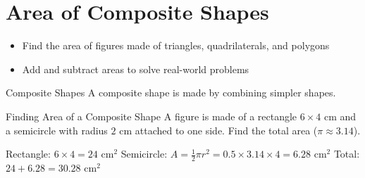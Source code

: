 \section{Area of Composite Shapes}

\begin{learningGoals}
\begin{itemize}
    \item Find the area of figures made of triangles, quadrilaterals, and polygons
    \item Add and subtract areas to solve real-world problems
\end{itemize}
\end{learningGoals}

\begin{conceptBox}{Composite Shapes}
A composite shape is made by combining simpler shapes.
\end{conceptBox}

\begin{workedExample}{Finding Area of a Composite Shape}
A figure is made of a rectangle $6 \times 4$ cm and a semicircle with radius $2$ cm attached to one side. Find the total area ($\pi \approx 3.14$).

Rectangle: $6 \times 4 = 24$ cm$^2$
Semicircle: $A = \frac{1}{2} \pi r^2 = 0.5 \times 3.14 \times 4 = 6.28$ cm$^2$
Total: $24 + 6.28 = 30.28$ cm$^2$
\end{workedExample}


